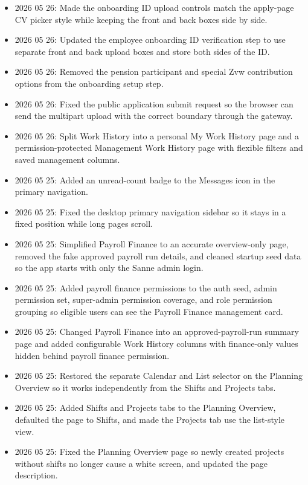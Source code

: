 \documentclass[11pt]{article}
\begin{document}
\begin{itemize}
    \item 2026 05 26: Made the onboarding ID upload controls match the apply-page CV picker style while keeping the front and back boxes side by side.
    \item 2026 05 26: Updated the employee onboarding ID verification step to use separate front and back upload boxes and store both sides of the ID.
    \item 2026 05 26: Removed the pension participant and special Zvw contribution options from the onboarding setup step.
    \item 2026 05 26: Fixed the public application submit request so the browser can send the multipart upload with the correct boundary through the gateway.
    \item 2026 05 26: Split Work History into a personal My Work History page and a permission-protected Management Work History page with flexible filters and saved management columns.
    \item 2026 05 25: Added an unread-count badge to the Messages icon in the primary navigation.
    \item 2026 05 25: Fixed the desktop primary navigation sidebar so it stays in a fixed position while long pages scroll.
    \item 2026 05 25: Simplified Payroll Finance to an accurate overview-only page, removed the fake approved payroll run details, and cleaned startup seed data so the app starts with only the Sanne admin login.
    \item 2026 05 25: Added payroll finance permissions to the auth seed, admin permission set, super-admin permission coverage, and role permission grouping so eligible users can see the Payroll Finance management card.
    \item 2026 05 25: Changed Payroll Finance into an approved-payroll-run summary page and added configurable Work History columns with finance-only values hidden behind payroll finance permission.
    \item 2026 05 25: Restored the separate Calendar and List selector on the Planning Overview so it works independently from the Shifts and Projects tabs.
    \item 2026 05 25: Added Shifts and Projects tabs to the Planning Overview, defaulted the page to Shifts, and made the Projects tab use the list-style view.
    \item 2026 05 25: Fixed the Planning Overview page so newly created projects without shifts no longer cause a white screen, and updated the page description.

\end{itemize}
\end{document}
